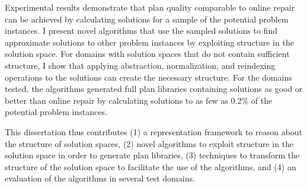 Experimental results demonstrate that plan quality comparable to online repair can be achieved by calculating solutions for a sample of the potential problem instances.  I present novel algorithms that use the sampled solutions to find approximate solutions to other problem instances by exploiting structure in the solution space.  For domains with solution spaces that do not contain sufficient structure, I show that applying abstraction, normalization, and reindexing operations to the solutions can create the necessary structure.  For the domains tested, the algorithms generated full plan libraries containing solutions as good or better than online repair by calculating solutions to as few as 0.2\% of the potential problem instances.

This dissertation thus contributes (1) a representation framework to reason about the structure of solution spaces, (2) novel algorithms to exploit structure in the solution space in order to generate plan libraries, (3) techniques to transform the structure of the solution space to facilitate the use of the algorithms, and (4) an evaluation of the algorithms in several test domains.






\par\vfil

